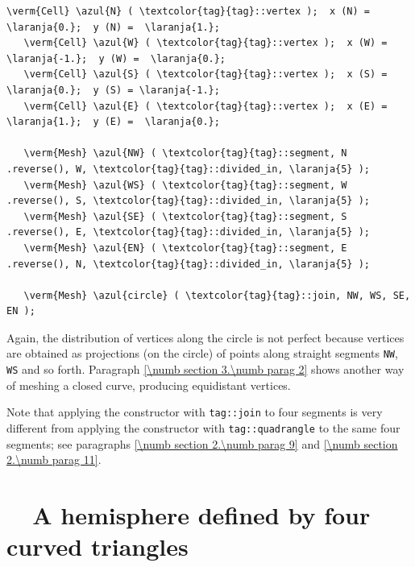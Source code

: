 \begin{Verbatim}[commandchars=\\\{\},formatcom=\small\tt,frame=single,
   label=parag-\ref{\numb section 2.\numb parag 5}.cpp,rulecolor=\color{moldura},
   baselinestretch=0.94,framesep=2mm]
   \verm{Cell} \azul{N} ( \textcolor{tag}{tag}::vertex );  x (N) =  \laranja{0.};  y (N) =  \laranja{1.};
   \verm{Cell} \azul{W} ( \textcolor{tag}{tag}::vertex );  x (W) = \laranja{-1.};  y (W) =  \laranja{0.};
   \verm{Cell} \azul{S} ( \textcolor{tag}{tag}::vertex );  x (S) =  \laranja{0.};  y (S) = \laranja{-1.};
   \verm{Cell} \azul{E} ( \textcolor{tag}{tag}::vertex );  x (E) =  \laranja{1.};  y (E) =  \laranja{0.};

   \verm{Mesh} \azul{NW} ( \textcolor{tag}{tag}::segment, N .reverse(), W, \textcolor{tag}{tag}::divided_in, \laranja{5} );
   \verm{Mesh} \azul{WS} ( \textcolor{tag}{tag}::segment, W .reverse(), S, \textcolor{tag}{tag}::divided_in, \laranja{5} );
   \verm{Mesh} \azul{SE} ( \textcolor{tag}{tag}::segment, S .reverse(), E, \textcolor{tag}{tag}::divided_in, \laranja{5} );
   \verm{Mesh} \azul{EN} ( \textcolor{tag}{tag}::segment, E .reverse(), N, \textcolor{tag}{tag}::divided_in, \laranja{5} );

   \verm{Mesh} \azul{circle} ( \textcolor{tag}{tag}::join, NW, WS, SE, EN );
\end{Verbatim}

Again, the distribution of vertices along the circle is not perfect
because vertices are obtained as projections (on the circle) of points
along straight segments {\small\tt NW}, {\small\tt WS} and so forth.
Paragraph \ref{\numb section 3.\numb parag 2} shows another way of meshing a closed curve,
producing equidistant vertices.

Note that applying the {\small\tt{}} constructor with {\small\tt\textcolor{tag}{tag}::join}
to four segments is very different from applying the {\small\tt{}} constructor with
{\small\tt\textcolor{tag}{tag}::quadrangle} to the same four segments;
see paragraphs \ref{\numb section 2.\numb parag 9} and \ref{\numb section 2.\numb parag 11}.


\section{~~A hemisphere defined by four curved triangles}\label{\numb section 2.\numb parag 6}

